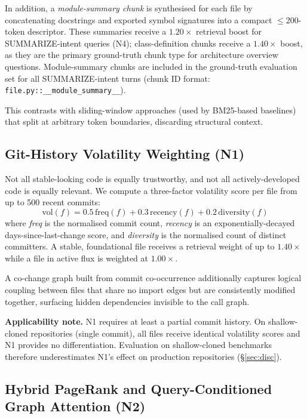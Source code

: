 \documentclass[runningheads]{llncs}
\begin{document}
In addition, a \emph{module-summary chunk} is synthesised for each
file by concatenating docstrings and exported symbol signatures
into a compact $\leq$200-token descriptor. These summaries receive
a $1.20\times$ retrieval boost for SUMMARIZE-intent queries (N4);
class-definition chunks receive a $1.40\times$ boost, as they are
the primary ground-truth chunk type for architecture overview
questions. Module-summary chunks are included in the ground-truth
evaluation set for all SUMMARIZE-intent turns (chunk ID format:
\texttt{file.py::\_\_module\_summary\_\_}).

This contrasts with sliding-window approaches (used by BM25-based
baselines) that split at arbitrary token boundaries, discarding
structural context.

\subsection{Git-History Volatility Weighting (N1)}

Not all stable-looking code is equally trustworthy, and not all
actively-developed code is equally relevant. We compute a
three-factor volatility score per file from up to 500 recent
commits:
\begin{equation}
\text{vol}(f) =
  0.5\,\text{freq}(f) + 0.3\,\text{recency}(f) + 0.2\,\text{diversity}(f)
\label{eq:vol}
\end{equation}
where \textit{freq} is the normalised commit count, \textit{recency}
is an exponentially-decayed days-since-last-change score, and
\textit{diversity} is the normalised count of distinct committers.
A stable, foundational file receives a retrieval weight of up to
$1.40\times$ while a file in active flux is weighted at $1.00\times$.

A co-change graph built from commit co-occurrence additionally
captures logical coupling between files that share no import edges
but are consistently modified together, surfacing hidden
dependencies invisible to the call graph.

\textbf{Applicability note.} N1 requires at least a partial commit
history. On shallow-cloned repositories (single commit), all files
receive identical volatility scores and N1 provides no
differentiation. Evaluation on shallow-cloned benchmarks therefore
underestimates N1's effect on production repositories
(\S\ref{sec:disc}).

\subsection{Hybrid PageRank and Query-Conditioned Graph Attention (N2)}
\end{document}
